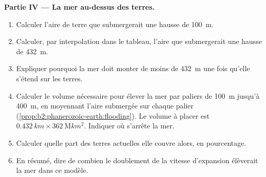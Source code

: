\begin{problem}
\noindent\textbf{Partie IV --- La mer au-dessus des terres.}
\begin{enumerate}[resume]
  \item Calculer l'aire de terre que submergerait une hausse de \qty{100}{m}.
  \item Calculer, par interpolation dans le tableau, l'aire que submergerait une hausse de \qty{432}{m}.
  \item Expliquer pourquoi la mer doit monter de moins de \qty{432}{m} une fois qu'elle s'étend sur les terres.
\item Calculer le volume nécessaire pour élever la mer par paliers de
\qty{100}{m} jusqu'à \qty{400}{m}, en moyennant l'aire submergée sur chaque
palier (\cref{prop:b2:phanerozoic-earth:flooding}). Le volume à placer est
$\qty{0.432}{km} \times \qty{362}{\mega km^2}$. Indiquer où s'arrête la mer.
  \item Calculer quelle part des terres actuelles elle couvre alors, en pourcentage.
  \item En résumé, dire de combien le doublement de la vitesse d'expansion élèverait la mer dans ce modèle.
\end{enumerate}
\end{problem}
